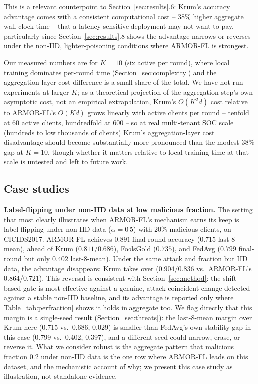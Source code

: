 \documentclass[pdflatex,iicol,sn-mathphys-num]{sn-jnl}%
\theoremstyle{thmstyleone}%
\theoremstyle{thmstyletwo}%
\theoremstyle{thmstylethree}%
\begin{document}
This is a relevant counterpoint to Section~\ref{sec:results}.6: Krum's accuracy advantage comes with a consistent computational cost -- 38\% higher aggregate wall-clock time -- that a latency-sensitive deployment may not want to pay, particularly since Section~\ref{sec:results}.8 shows the advantage narrows or reverses under the non-IID, lighter-poisoning conditions where ARMOR-FL is strongest.

Our measured numbers are for $K=10$ (six active per round), where local training dominates per-round time (Section~\ref{sec:complexity}) and the aggregation-layer cost difference is a small share of the total. We have not run experiments at larger $K$; as a theoretical projection of the aggregation step's own asymptotic cost, not an empirical extrapolation, Krum's $O(K^2d)$ cost relative to ARMOR-FL's $O(Kd)$ grows linearly with active clients per round -- tenfold at 60 active clients, hundredfold at 600 -- so at real multi-tenant SOC scale (hundreds to low thousands of clients) Krum's aggregation-layer cost disadvantage should become substantially more pronounced than the modest 38\% gap at $K=10$, though whether it matters relative to local training time at that scale is untested and left to future work.

\subsection{Case studies}\label{sec:casestudy1}

\textbf{Label-flipping under non-IID data at low malicious fraction.} The setting that most clearly illustrates when ARMOR-FL's mechanism earns its keep is label-flipping under non-IID data ($\alpha=0.5$) with 20\% malicious clients, on CICIDS2017. ARMOR-FL achieves $0.891$ final-round accuracy ($0.715$ last-8-mean), ahead of Krum ($0.811$/$0.686$), FoolsGold ($0.735$), and FedAvg ($0.799$ final-round but only $0.402$ last-8-mean). Under the same attack and fraction but IID data, the advantage disappears: Krum takes over ($0.904$/$0.836$ vs.\ ARMOR-FL's $0.864$/$0.721$). This reversal is consistent with Section~\ref{sec:method}: the shift-based gate is most effective against a genuine, attack-coincident change detected against a stable non-IID baseline, and its advantage is reported only where Table~\ref{tab:perfraction} shows it holds in aggregate too. We flag directly that this margin is a single-seed result (Section~\ref{sec:threats}): the last-8-mean margin over Krum here (0.715 vs.\ 0.686, 0.029) is smaller than FedAvg's own stability gap in this case (0.799 vs.\ 0.402, 0.397), and a different seed could narrow, erase, or reverse it. What we consider robust is the aggregate pattern that malicious fraction 0.2 under non-IID data is the one row where ARMOR-FL leads on this dataset, and the mechanistic account of why; we present this case study as illustration, not standalone evidence.
\end{document}
